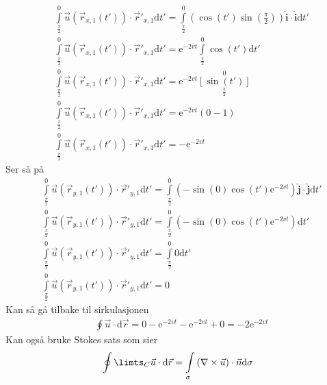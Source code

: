\documentclass[a4paper,10pt,norsk]{article}
\newcommand{\dd}[1]{\mathrm{d}#1}
\newcommand{\uvec}[1]{\boldsymbol{\hat{\textbf{#1}}}}
\begin{document}
		\begin{align*}
			&\int\limits_{\frac{\pi}{2}}^0 \vec{u} \left( \vec{r}_{x,1}(t') \right) \cdot \overrightarrow{r}'_{x,1} \dd{t'} = 
			\int\limits_{\frac{\pi}{2}}^0 \left( \cos(t') \sin\left (\frac{\pi}{2} \right)  \right) \uvec{i} \cdot \uvec{i} \dd{t'}\\
			&\int\limits_{\frac{\pi}{2}}^0 \vec{u} \left( \vec{r}_{x,1}(t') \right) \cdot \overrightarrow{r}'_{x,1} \dd{t'} =
			\mathrm{e}^{-2vt}\int\limits_{\frac{\pi}{2}}^0 \cos(t') \dd{t'}\\ 
			&\int\limits_{\frac{\pi}{2}}^0 \vec{u} \left( \vec{r}_{x,1}(t') \right) \cdot \overrightarrow{r}'_{x,1} \dd{t'} =
			\mathrm{e}^{-2vt} \left[ \sin(t') \right]\limits_{\frac{\pi}{2}}^0\\
			&\int\limits_{\frac{\pi}{2}}^0 \vec{u} \left( \vec{r}_{x,1}(t') \right) \cdot \overrightarrow{r}'_{x,1} \dd{t'} =
			\mathrm{e}^{-2vt} \left( 0-1 \right) \\
			&\int\limits_{\frac{\pi}{2}}^0 \vec{u} \left( \vec{r}_{x,1}(t') \right) \cdot \overrightarrow{r}'_{x,1} \dd{t'} =
			-\mathrm{e}^{-2vt}
		\end{align*}
		Ser så på
		\begin{align*}
			&\int\limits_{\frac{\pi}{2}}^0 \vec{u} \left( \vec{r}_{y,1}(t') \right) \cdot \overrightarrow{r}'_{y,1} \dd{t'} = 
			\int\limits_{\frac{\pi}{2}}^0 \left( -\sin(0) \cos(t') \mathrm{e}^{-2vt}  \right) \uvec{j} \cdot \uvec{j} \dd{t'}\\
			&\int\limits_{\frac{\pi}{2}}^0 \vec{u} \left( \vec{r}_{y,1}(t') \right) \cdot \overrightarrow{r}'_{y,1} \dd{t'} =
			\int\limits_{\frac{\pi}{2}}^0 \left( -\sin(0) \cos(t') \mathrm{e}^{-2vt}  \right) \dd{t'}\\
			&\int\limits_{\frac{\pi}{2}}^0 \vec{u} \left( \vec{r}_{y,1}(t') \right) \cdot \overrightarrow{r}'_{y,1} \dd{t'} =
			\int\limits_{\frac{\pi}{2}}^0 0 \dd{t'}\\
			&\int\limits_{\frac{\pi}{2}}^0 \vec{u} \left( \vec{r}_{y,1}(t') \right) \cdot \overrightarrow{r}'_{y,1} \dd{t'} = 0
		\end{align*}
		Kan så gå tilbake til sirkulasjonen
		\begin{align*}
			&\oint \vec{u}  \cdot \dd{\vec{r} } = 0  - \mathrm{e}^{-2vt} - \mathrm{e}^{-2vt} + 0 = -2 \mathrm{e}^{-2vt}
		\end{align*}
		Kan også bruke Stokes sats som sier \[
			\oint\limts_C \vec{u} \cdot \dd{\vec{r}} = \int\limits_\sigma \left( \nabla \times \vec{u}  \right) \cdot \vec{n} \dd{\sigma}
		\] 
\end{document}
